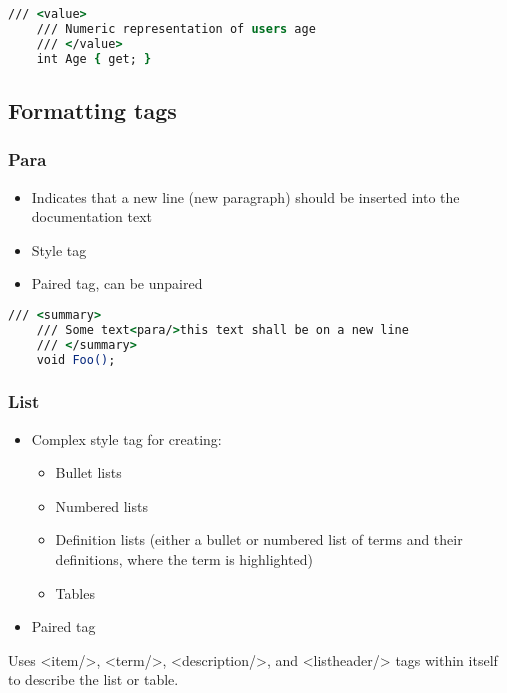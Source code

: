 \begin{lstlisting}[language=csh]
    /// <value>
    /// Numeric representation of users age
    /// </value>
    int Age { get; }
\end{lstlisting}

\subsection{Formatting tags}

\subsubsection*{Para}
\begin{itemize}
    \item Indicates that a new line (new paragraph) should be inserted into the documentation text
    \item Style tag
    \item Paired tag, can be unpaired
\end{itemize}

\begin{lstlisting}[language=csh]
    /// <summary>
    /// Some text<para/>this text shall be on a new line
    /// </summary>
    void Foo();
\end{lstlisting}

\subsubsection*{List}
\begin{itemize}
    \item Complex style tag for creating:
    \begin{itemize}
        \item Bullet lists
        \item Numbered lists
        \item Definition lists (either a bullet or numbered list of terms and their definitions, where the term is highlighted)
        \item Tables
    \end{itemize}
    \item Paired tag
\end{itemize}

Uses <item/>, <term/>, <description/>, and <listheader/> tags within itself to describe the list or table.

